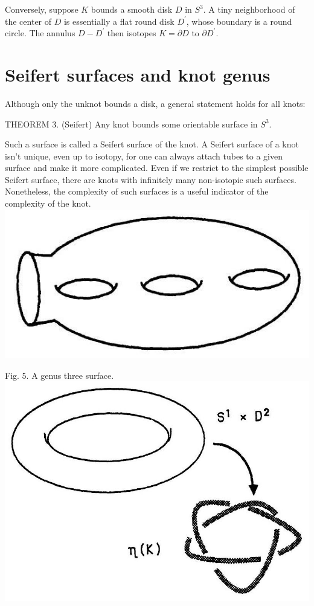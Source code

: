 \documentclass[10pt, letterpaper]{article}
\begin{document}
Conversely, suppose $K$ bounds a smooth disk $D$ in $S^{3}$. A tiny neighborhood of the center of $D$ is essentially a flat round disk $D^{\prime}$, whose boundary is a round circle. The annulus $D-D^{\prime}$ then isotopes $K=\partial D$ to $\partial D^{\prime}$.



\section{Seifert surfaces and knot genus}

Although only the unknot bounds a disk, a general statement holds for all knots:

THEOREM 3. (Seifert) Any knot bounds some orientable surface in $S^{3}$.

Such a surface is called a Seifert surface of the knot. A Seifert surface of a knot isn't unique, even up to isotopy, for one can always attach tubes to a given surface and make it more complicated. Even if we restrict to the simplest possible Seifert surface, there are knots with infinitely many non-isotopic such surfaces. Nonetheless, the complexity of such surfaces is a useful indicator of the complexity of the knot.\\
\includegraphics[scale=0.2, center]{2025_05_21_037de704f595ce642d3eg-079}

Fig. 5. A genus three surface.\\
\includegraphics[scale=0.2, center]{2025_05_21_037de704f595ce642d3eg-079(1)}
\end{document}
